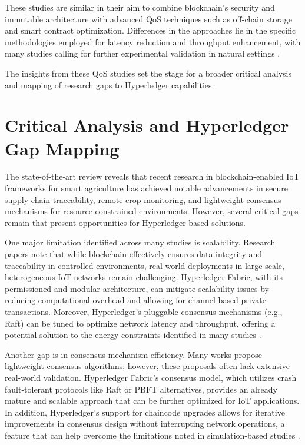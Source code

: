 \documentclass[12pt,onecolumn]{IEEEtran} %
\begin{document}
These studies are similar in their aim to combine blockchain's security and immutable architecture with advanced QoS techniques such as off-chain storage and smart contract optimization. Differences in the approaches lie in the specific methodologies employed for latency reduction and throughput enhancement, with many studies calling for further experimental validation in natural settings \cite{ellahi2023blockchainbasedframeworksfor, ellahi2023blockchainbasedframeworksfor}.

The insights from these QoS studies set the stage for a broader critical analysis and mapping of research gaps to Hyperledger capabilities.

\section{Critical Analysis and Hyperledger Gap Mapping}
The state-of-the-art review reveals that recent research in blockchain-enabled IoT frameworks for smart agriculture has achieved notable advancements in secure supply chain traceability, remote crop monitoring, and lightweight consensus mechanisms for resource-constrained environments. However, several critical gaps remain that present opportunities for Hyperledger-based solutions.

One major limitation identified across many studies is scalability. Research papers \cite{aliyu2023blockchainbasedsmartfarm, ellahi2023blockchainbasedframeworksfor, sakthivel2024enhancingtransparencyand} note that while blockchain effectively ensures data integrity and traceability in controlled environments, real-world deployments in large-scale, heterogeneous IoT networks remain challenging. Hyperledger Fabric, with its permissioned and modular architecture, can mitigate scalability issues by reducing computational overhead and allowing for channel-based private transactions. Moreover, Hyperledger's pluggable consensus mechanisms (e.g., Raft) can be tuned to optimize network latency and throughput, offering a potential solution to the energy constraints identified in many studies \cite{aliyu2023blockchainbasedsmartfarm, ellahi2023blockchainbasedframeworksfor, sakthivel2024enhancingtransparencyand}.

Another gap is in consensus mechanism efficiency. Many works \cite{ali2022blockchainenabledarchitecture, morais2023surveyonintegration, khan2022ablockchainand} propose lightweight consensus algorithms; however, these proposals often lack extensive real-world validation. Hyperledger Fabric's consensus model, which utilizes crash fault-tolerant protocols like Raft or PBFT alternatives, provides an already mature and scalable approach that can be further optimized for IoT applications. In addition, Hyperledger's support for chaincode upgrades allows for iterative improvements in consensus design without interrupting network operations, a feature that can help overcome the limitations noted in simulation-based studies \cite{saha2022blockchainchangingthe, ali2022blockchainenabledarchitecture}.
\end{document}
